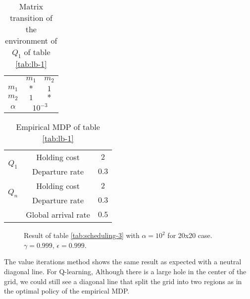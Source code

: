 \documentclass[
  a4paper, xcolor = usenames,dvipsnames]{article}
\theoremstyle{definition}
\theoremstyle{definition}
\theoremstyle{definition}
\theoremstyle{definition}
\theoremstyle{remark}
\begin{document}
\begin{table}[!htbp]
\caption{Matrix transition of the environment of $Q_{1}$ of table \ref{tab:lb-1}}
\begin{center}
\begin{tabular}{c c c}
    \hline
    & $m_{1}$ & $m_{2}$ \\
    $m_{1}$ & $*$ & $1$ \\
    $m_{2}$ & $1$ & $*$ \\
    \hline
    $\alpha$ & \multicolumn{2}{c}{$10^{-3}$} \\
    \hline
\end{tabular}
\end{center}
\label{tab:lb-1-mat-1}
\end{table}

\begin{table}[!htbp]
\caption{Empirical MDP of table \ref{tab:lb-1}}
\begin{center}
\begin{tabular}{c c c}
    \hline
    \multirow{2}{*}{$Q_{1}$} &  Holding cost & $2$ \\
    & Departure rate & $0.3$ \\
    \cline{2-3}
    \multirow{2}{*}{$Q_{n}$} &  Holding cost & $2$ \\
    & Departure rate & $0.3$ \\
    \cline{2-3}
    & Global arrival rate & $0.5$ \\
    \hline
\end{tabular}
\end{center}
\label{tab:mdp-lb-1}
\end{table}



\begin{figure}

{\centering {}

}

\caption{Result of table \ref{tab:scheduling-3} with \(\alpha = 10^{2}\) for 20x20 case. \(\gamma = 0.999\), \(\epsilon = 0.999\).}\label{fig:20x20-lb-1}
\end{figure}

The value iterations method shows the same result as expected with a neutral diagonal line. For Q-learning, Although there is a large hole in the center of the grid, we could still see a diagonal line that split the grid into two regions as in the optimal policy of the empirical MDP.
\end{document}
